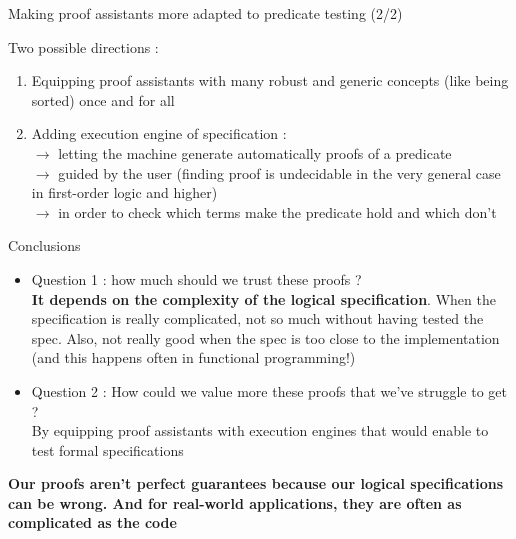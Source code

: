 \documentclass[french]{beamer}
\begin{document}
\begin{frame}[fragile]{Making proof assistants more adapted to predicate testing (2/2)}


Two possible directions :

\begin{enumerate}
\item Equipping proof assistants with many robust and generic concepts (like being sorted) once and for all

\item Adding execution engine of specification : \\
$\rightarrow$ letting the machine generate automatically proofs of a predicate\\
$\rightarrow$ guided by the user (finding proof is undecidable in the very general case in first-order logic and higher) \\
$\rightarrow$ in order to check which terms make the predicate hold and which don't 

\end{enumerate}



\end{frame}



\begin{frame}{Conclusions}

	\begin{itemize}
	
	\item Question 1 : how much should we trust these proofs ? \\
	\pause \textbf{It depends on the complexity of the logical specification}. When the specification is really complicated, not so much without having tested the spec. Also, not really good when the spec is too close to the implementation (and this happens often in functional programming!)
	
	\item Question 2 : How could we value more these proofs that we've struggle to get ? \\
	\pause By equipping proof assistants with execution engines	that would enable to test formal specifications
		
	\end{itemize}

	\textbf{Our proofs aren't perfect guarantees because our logical specifications can be wrong. And for real-world applications, they are often as complicated as the code}

\end{frame}
\end{document}
